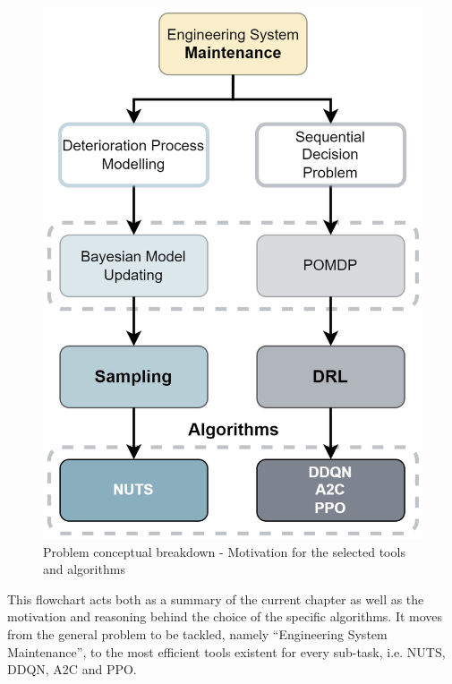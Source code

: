 \begin{figure}[H]
    \centering
	\includegraphics[width=0.5\linewidth]{Figures/conceptFlowV2.png}
	\caption{Problem conceptual breakdown - Motivation for the selected tools and algorithms}
	\label{concFlow2}
\end{figure}

This flowchart acts both as a summary of the current chapter as well as the motivation and reasoning behind the choice of the specific algorithms. It moves from the general problem to be tackled, namely ``Engineering System Maintenance'', to the most efficient tools existent for every sub-task, i.e. \gls{NUTS}, \gls{DDQN}, \gls{A2C} and \gls{PPO}.